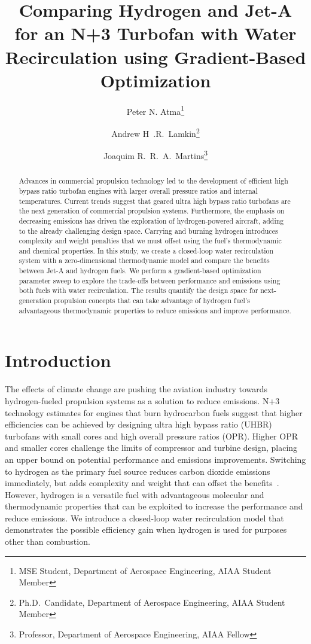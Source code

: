 \documentclass[conf]{new-aiaa}
\title{Comparing Hydrogen and Jet-A for an N+3 Turbofan with Water Recirculation using Gradient-Based Optimization} %
\author{Peter N. Atma\footnote{MSE Student, Department of Aerospace Engineering, AIAA Student Member}}
\author{Andrew H~.R.~Lamkin\footnote{Ph.D.~Candidate, Department of Aerospace Engineering, AIAA Student Member}}
\author{Joaquim R.~R.~A.~Martins\footnote{Professor, Department of Aerospace Engineering, AIAA Fellow}}
\affil{University of Michigan, Ann Arbor, MI, 48109}
\begin{document}
\maketitle

\begin{abstract}
    Advances in commercial propulsion technology led to the development of efficient high bypass ratio turbofan engines with larger overall pressure ratios and internal temperatures.
    Current trends suggest that geared ultra high bypass ratio turbofans are the next generation of commercial propulsion systems.
    Furthermore, the emphasis on decreasing emissions has driven the exploration of hydrogen-powered aircraft, adding to the already challenging design space.
    Carrying and burning hydrogen introduces complexity and weight penalties that we must offset using the fuel's thermodynamic and chemical properties.
    In this study, we create a closed-loop water recirculation system with a zero-dimensional thermodynamic model and compare the benefits between Jet-A and hydrogen fuels.
    We perform a gradient-based optimization parameter sweep to explore the trade-offs between performance and emissions using both fuels with water recirculation.
    The results quantify the design space for next-generation propulsion concepts that can take advantage of hydrogen fuel's advantageous thermodynamic properties to reduce emissions and improve performance.
\end{abstract}

\section{Introduction}
The effects of climate change are pushing the aviation industry towards hydrogen-fueled propulsion systems as a solution to reduce emissions.
N+3 technology estimates for engines that burn hydrocarbon fuels suggest that higher efficiencies can be achieved by designing ultra high bypass ratio (UHBR) turbofans with small cores and high overall pressure ratios (OPR).
Higher OPR and smaller cores challenge the limits of compressor and turbine design, placing an upper bound on potential performance and emissions improvements.
Switching to hydrogen as the primary fuel source reduces carbon dioxide emissions immediately, but adds complexity and weight that can offset the benefits~\cite{Adler2023}.
However, hydrogen is a versatile fuel with advantageous molecular and thermodynamic properties that can be exploited to increase the performance and reduce emissions.
We introduce a closed-loop water recirculation model that demonstrates the possible efficiency gain when hydrogen is used for purposes other than combustion.
\end{document}

